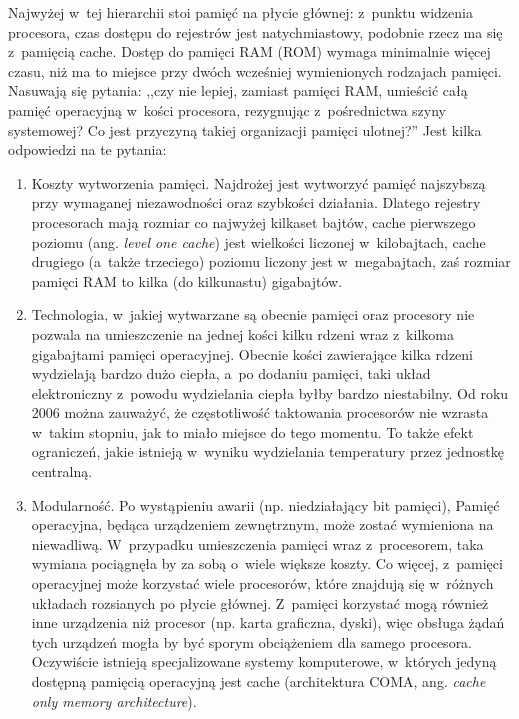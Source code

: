 \documentclass[11pt,makeidx]{mwart}
\begin{document}
	Najwyżej w~tej hierarchii stoi pamięć na płycie głównej: z~punktu widzenia procesora, czas dostępu do rejestrów jest natychmiastowy,
	podobnie rzecz ma się z~pamięcią cache. Dostęp do pamięci RAM (ROM) wymaga minimalnie więcej czasu, niż ma to miejsce przy dwóch
	wcześniej wymienionych rodzajach pamięci. Nasuwają się pytania: ,,czy nie lepiej, zamiast pamięci RAM, umieścić całą
	pamięć operacyjną w~kości procesora, rezygnując z~pośrednictwa szyny systemowej\mbox{}? Co jest przyczyną takiej organizacji pamięci ulotnej\mbox{}?''
	Jest kilka odpowiedzi na te pytania:
	\begin{enumerate}
		\item Koszty wytworzenia pamięci. Najdrożej jest wytworzyć pamięć najszybszą przy wymaganej niezawodności oraz szybkości działania.
			Dlatego rejestry procesorach mają rozmiar co najwyżej kilkaset bajtów, cache pierwszego poziomu (ang. \emph{level one cache})
			jest wielkości liczonej w~kilobajtach, cache drugiego (a~także trzeciego) poziomu liczony jest w~megabajtach, zaś
			rozmiar pamięci RAM to kilka (do kilkunastu) gigabajtów.
		\item Technologia, w~jakiej wytwarzane są obecnie pamięci oraz procesory nie pozwala na umieszczenie na jednej kości kilku rdzeni
			wraz z~kilkoma gigabajtami pamięci operacyjnej. Obecnie kości zawierające kilka rdzeni wydzielają bardzo dużo ciepła, a~po dodaniu
			pamięci, taki układ elektroniczny z~powodu wydzielania ciepła byłby bardzo niestabilny. Od roku 2006 można zauważyć,
			że częstotliwość taktowania procesorów nie wzrasta w~takim stopniu, jak to miało miejsce do tego momentu. To także efekt ograniczeń,
			jakie istnieją w~wyniku wydzielania temperatury przez jednostkę centralną.
		\item Modularność. Po wystąpieniu awarii (np. niedziałający bit pamięci), Pamięć operacyjna, będąca urządzeniem zewnętrznym, może zostać
			wymieniona na niewadliwą. W~przypadku umieszczenia pamięci wraz z~procesorem, taka wymiana pociągnęła by za sobą o~wiele większe
			koszty. Co więcej, z~pamięci operacyjnej może korzystać wiele procesorów, które znajdują się w~różnych układach rozsianych po płycie głównej.
			Z~pamięci korzystać mogą również inne urządzenia niż procesor (np. karta graficzna, dyski), więc obsługa żądań tych urządzeń mogła by być
			sporym obciążeniem dla samego procesora. Oczywiście istnieją specjalizowane systemy komputerowe, w~których jedyną dostępną 
			pamięcią operacyjną jest cache (architektura COMA, ang. \emph{cache only memory architecture}).
	\end{enumerate}
\end{document}
